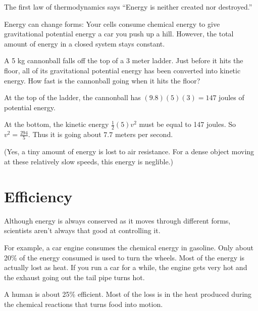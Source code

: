 The first law of thermodynamics says ``Energy is neither created nor
destroyed.''

Energy can change forms: Your cells consume chemical energy to give
gravitational potential energy a car you push up a hill. However, the total amount of
energy in a closed system stays constant.

\begin{Exercise}[title={The Energy of Falling}, label=energy_falling]
  
A 5 kg cannonball falls off the top of a 3 meter ladder. Just before
it hits the floor, all of its gravitational potential energy has been
converted into kinetic energy.  How fast is the cannonball going when
it hits the floor?

\end{Exercise}
\begin{Answer}[ref=energy_falling]

  At the top of the ladder, the cannonball has $(9.8)(5)(3) = 147$ joules of potential energy.

  At the bottom, the kinetic energy $\frac{1}{2}(5)v^2$ must be equal
  to 147 joules. So $v^2 = \frac{294}{5}$.  Thus it is going about
  $7.7$ meters per second.

  (Yes, a tiny amount of energy is lost to air resistance. For a dense
  object moving at these relatively slow speeds, this energy is
  neglible.)
  
\end{Answer}


\section{Efficiency}

Although energy is always conserved as it moves through different
forms, scientists aren't always that good at controlling it.

For example, a car engine consumes the chemical energy in gasoline. Only
about 20\% of the energy consumed is used to turn the wheels.  Most of
the energy is actually lost as heat. If you run a car for a while, the engine
gets very hot and the exhaust going out the tail pipe turns hot.

A human is about 25\% efficient. Most of the loss is in the heat produced
during the chemical reactions that turns food into motion.
 
